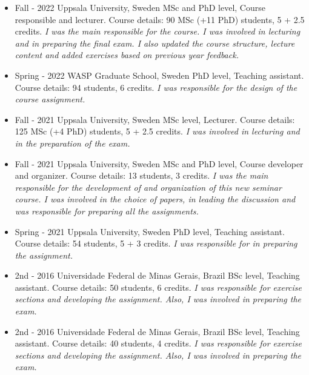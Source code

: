 \documentclass[10pt,A4]{article} %
\begin{document}
 \begin{itemize}

    \item {}
    {   Fall - 2022  }
    { Uppsala University, Sweden }
    {  MSc and PhD level, Course responsible and lecturer. Course details: 90 MSc (+11 PhD) students, 5 + 2.5 credits.  \emph{ I was the main responsible for the course. I was involved in lecturing and in preparing the final exam. I also updated the course structure, lecture content and added exercises based on previous year feedback. } }
    
    \item {}
    {   Spring - 2022  }
    { WASP Graduate School, Sweden }
    {  PhD level, Teaching assistant. Course details: 94 students, 6 credits.  \emph{ I was responsible for the design of the course assignment. } }
    
    \item {}
    {   Fall - 2021  }
    { Uppsala University, Sweden }
    {  MSc level, Lecturer. Course details: 125 MSc (+4 PhD) students, 5 + 2.5 credits.  \emph{ I was involved in lecturing and in the preparation of the exam. } }
    
    \item {}
    {   Fall - 2021  }
    { Uppsala University, Sweden }
    {  MSc and PhD level, Course developer and organizer. Course details: 13 students, 3 credits.  \emph{ I was the main responsible for the development of and organization of this new seminar course. I was involved in the choice of papers, in leading the discussion and was responsible for preparing all the assignments. } }
    
    \item {}
    {   Spring - 2021  }
    { Uppsala University, Sweden }
    {  PhD level, Teaching assistant. Course details: 54 students, 5 + 3 credits.  \emph{ I was responsible for in preparing the assignment. } }
    
    \item {}
    {   2nd - 2016  }
    { Universidade Federal de Minas Gerais, Brazil }
    {  BSc level, Teaching assistant. Course details: 50 students, 6 credits.  \emph{ I was responsible for exercise sections and developing the assignment. Also, I was involved in preparing the exam. } }
    
    \item {}
    {   2nd - 2016  }
    { Universidade Federal de Minas Gerais, Brazil }
    {  BSc level, Teaching assistant. Course details: 40 students, 4 credits.  \emph{ I was responsible for exercise sections and developing the assignment. Also, I was involved in preparing the exam. } }
    
\end{itemize}
\end{document}
